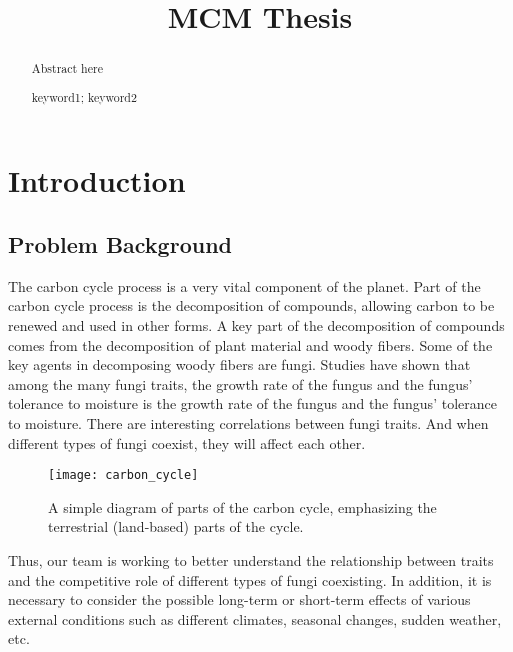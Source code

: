 \documentclass{mcmthesis}
\title{MCM Thesis}
\begin{document}
\begin{abstract}
  Abstract here


\begin{keywords}
keyword1; keyword2
\end{keywords}
\end{abstract}
\maketitle
\tableofcontents
\newpage

\section{Introduction}
\subsection{Problem Background}

The carbon cycle process is a very vital component of the planet. Part of the carbon cycle process is the decomposition of compounds, allowing carbon to be renewed and used in other forms. A key part of the decomposition of compounds comes from the decomposition of plant material and woody fibers. Some of the key agents in decomposing woody fibers are fungi. Studies have shown that among the many fungi traits, the growth rate of the fungus and the fungus' tolerance to moisture is the growth rate of the fungus and the fungus' tolerance to moisture. There are interesting correlations between fungi traits. And when different types of fungi coexist, they will affect each other. 

\begin{figure}[H]
\small
\centering
\texttt{[image: carbon\_cycle]}
\caption{A simple diagram of parts of the carbon cycle, emphasizing the terrestrial (land-based) parts of the cycle.\cite{carbon_cycle}}
\label{carbon_cycle}
\end{figure}

Thus, our team is working to better understand the relationship between traits and the competitive role of different types of fungi coexisting. In addition, it is necessary to consider the possible long-term or short-term effects of various external conditions such as different climates, seasonal changes, sudden weather, etc. 
\end{document}
